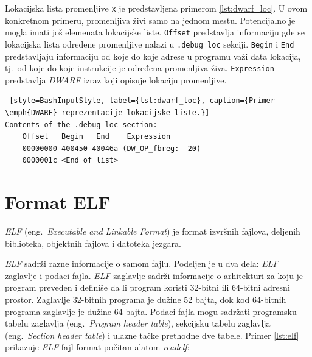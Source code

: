 \documentclass[12pt,oneside]{memoir}
\begin{document}
Lokacijska lista promenljive \texttt{x} je predstavljena primerom \ref{lst:dwarf_loc}. U ovom konkretnom primeru, promenljiva živi samo na jednom mestu. Potencijalno je mogla imati još elemenata lokacijske liste. \texttt{Offset} predstavlja informaciju gde se lokacijska lista određene promenljive nalazi u \texttt{.debug\_loc} sekciji. \texttt{Begin} i \texttt{End} predstavljaju informaciju od koje do koje adrese u programu važi data lokacija, tj.~od koje do koje instrukcije je određena promenljiva živa. \texttt{Expression} predstavlja \emph{DWARF} izraz koji opisuje lokaciju promenljive.

\begin{lstlisting} [style=BashInputStyle, label={lst:dwarf_loc}, caption={Primer \emph{DWARF} reprezentacije lokacijske liste.}]
Contents of the .debug_loc section:
	Offset   Begin   End    Expression
	00000000 400450 40046a (DW_OP_fbreg: -20)
	0000001c <End of list>
\end{lstlisting}


\section{Format ELF}

\emph{ELF} (eng.~\emph{Executable and Linkable Format}) \cite{ELF} je format izvršnih fajlova, deljenih biblioteka, objektnih fajlova i datoteka jezgara.

\emph{ELF} sadrži razne informacije o samom fajlu. Podeljen je u dva dela: \emph{ELF} zaglavlje i podaci fajla. \emph{ELF} zaglavlje sadrži informacije o arhitekturi za koju je program preveden i definiše da li program koristi 32-bitni ili 64-bitni adresni prostor. Zaglavlje 32-bitnih programa je dužine 52 bajta, dok kod 64-bitnih programa zaglavlje je dužine 64 bajta. Podaci fajla mogu sadržati programsku tabelu zaglavlja (eng.~\emph{Program header table}), sekcijsku tabelu zaglavlja (eng.~\emph{Section header table}) i ulazne tačke prethodne dve tabele. Primer \ref{lst:elf} prikazuje \emph{ELF} fajl format počitan alatom \emph{readelf}:
\end{document}
